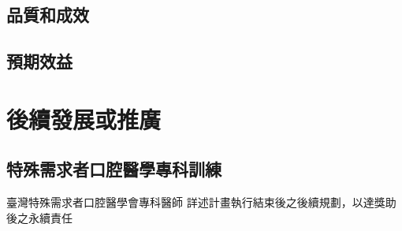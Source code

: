 
\subsection{品質和成效}

\subsection{預期效益}


\section{後續發展或推廣}
\subsection{特殊需求者口腔醫學專科訓練}
臺灣特殊需求者口腔醫學會專科醫師
詳述計畫執行結束後之後續規劃，以達獎助後之永續責任

